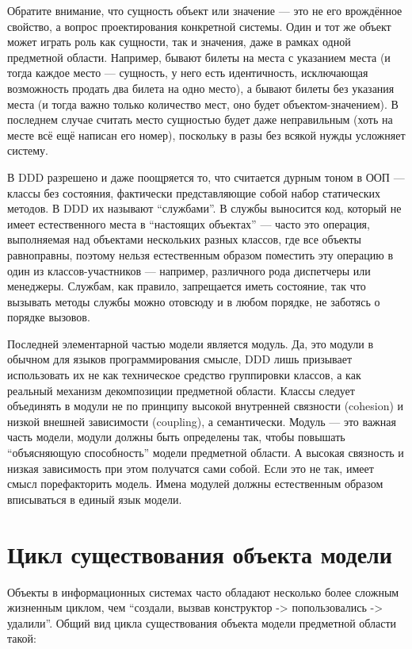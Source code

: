 \documentclass[a5paper]{article}
\begin{document}
Обратите внимание, что сущность объект или значение --- это не его врождённое свойство, а вопрос проектирования конкретной системы. Один и тот же объект может играть роль как сущности, так и значения, даже в рамках одной предметной области. Например, бывают билеты на места с указанием места (и тогда каждое место --- сущность, у него есть идентичность, исключающая возможность продать два билета на одно место), а бывают билеты без указания места (и тогда важно только количество мест, оно будет объектом-значением). В последнем случае считать место сущностью будет даже неправильным (хоть на месте всё ещё написан его номер), поскольку в разы без всякой нужды усложняет систему.

В DDD разрешено и даже поощряется то, что считается дурным тоном в ООП --- классы без состояния, фактически представляющие собой набор статических методов. В DDD их называют ``службами''. В службы выносится код, который не имеет естественного места в ``настоящих объектах'' --- часто это операция, выполняемая над объектами нескольких разных классов, где все объекты равноправны, поэтому нельзя естественным образом поместить эту операцию в один из классов-участников --- например, различного рода диспетчеры или менеджеры. Службам, как правило, запрещается иметь состояние, так что вызывать методы службы можно отовсюду и в любом порядке, не заботясь о порядке вызовов.

Последней элементарной частью модели является модуль. Да, это модули в обычном для языков программирования смысле, DDD лишь призывает использовать их не как техническое средство группировки классов, а как реальный механизм декомпозиции предметной области. Классы следует объединять в модули не по принципу высокой внутренней связности (cohesion) и низкой внешней зависимости (coupling), а семантически. Модуль --- это важная часть модели, модули должны быть определены так, чтобы повышать ``объясняющую способность'' модели предметной области. А высокая связность и низкая зависимость при этом получатся сами собой. Если это не так, имеет смысл порефакторить модель. Имена модулей должны естественным образом вписываться в единый язык модели.

\section{Цикл существования объекта модели}

Объекты в информационных системах часто обладают несколько более сложным жизненным циклом, чем ``создали, вызвав конструктор -> попользовались -> удалили''. Общий вид цикла существования объекта модели предметной области такой:
\end{document}
